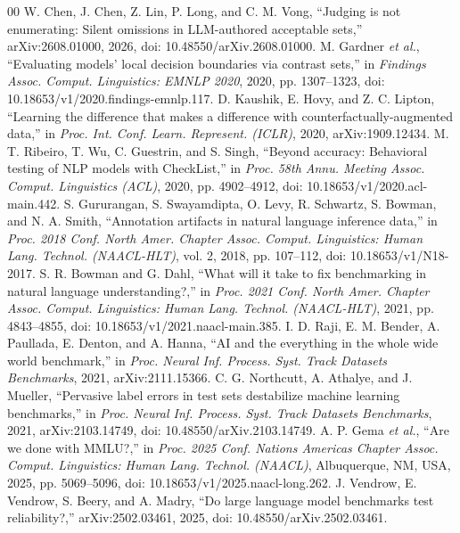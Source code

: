 \documentclass{ieeeaccess}
\begin{document}
\begin{thebibliography}{00}
 W. Chen, J. Chen, Z. Lin, P. Long, and C. M. Vong, ``Judging is not enumerating: Silent omissions in LLM-authored acceptable sets,'' arXiv:2608.01000, 2026, doi: 10.48550/arXiv.2608.01000.
 M. Gardner \emph{et al.}, ``Evaluating models' local decision boundaries via contrast sets,'' in \emph{Findings Assoc. Comput. Linguistics: EMNLP 2020}, 2020, pp. 1307--1323, doi: 10.18653/v1/2020.findings-emnlp.117.
 D. Kaushik, E. Hovy, and Z. C. Lipton, ``Learning the difference that makes a difference with counterfactually-augmented data,'' in \emph{Proc. Int. Conf. Learn. Represent. (ICLR)}, 2020, arXiv:1909.12434.
 M. T. Ribeiro, T. Wu, C. Guestrin, and S. Singh, ``Beyond accuracy: Behavioral testing of NLP models with CheckList,'' in \emph{Proc. 58th Annu. Meeting Assoc. Comput. Linguistics (ACL)}, 2020, pp. 4902--4912, doi: 10.18653/v1/2020.acl-main.442.
 S. Gururangan, S. Swayamdipta, O. Levy, R. Schwartz, S. Bowman, and N. A. Smith, ``Annotation artifacts in natural language inference data,'' in \emph{Proc. 2018 Conf. North Amer. Chapter Assoc. Comput. Linguistics: Human Lang. Technol. (NAACL-HLT)}, vol. 2, 2018, pp. 107--112, doi: 10.18653/v1/N18-2017.
 S. R. Bowman and G. Dahl, ``What will it take to fix benchmarking in natural language understanding?,'' in \emph{Proc. 2021 Conf. North Amer. Chapter Assoc. Comput. Linguistics: Human Lang. Technol. (NAACL-HLT)}, 2021, pp. 4843--4855, doi: 10.18653/v1/2021.naacl-main.385.
 I. D. Raji, E. M. Bender, A. Paullada, E. Denton, and A. Hanna, ``AI and the everything in the whole wide world benchmark,'' in \emph{Proc. Neural Inf. Process. Syst. Track Datasets Benchmarks}, 2021, arXiv:2111.15366.
 C. G. Northcutt, A. Athalye, and J. Mueller, ``Pervasive label errors in test sets destabilize machine learning benchmarks,'' in \emph{Proc. Neural Inf. Process. Syst. Track Datasets Benchmarks}, 2021, arXiv:2103.14749, doi: 10.48550/arXiv.2103.14749.
 A. P. Gema \emph{et al.}, ``Are we done with MMLU?,'' in \emph{Proc. 2025 Conf. Nations Americas Chapter Assoc. Comput. Linguistics: Human Lang. Technol. (NAACL)}, Albuquerque, NM, USA, 2025, pp. 5069--5096, doi: 10.18653/v1/2025.naacl-long.262.
 J. Vendrow, E. Vendrow, S. Beery, and A. Madry, ``Do large language model benchmarks test reliability?,'' arXiv:2502.03461, 2025, doi: 10.48550/arXiv.2502.03461.

\end{thebibliography}
\end{document}
